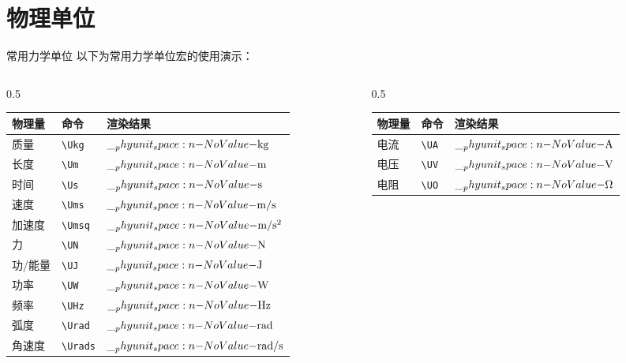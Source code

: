 \documentclass[darkmode=false, randomquote=true, quoteseed=2026, shownav=false,handout=false]{HiBeamer}
\begin{document}
\section{物理单位}

\begin{frame}{常用力学单位}
 以下为常用力学单位宏的使用演示：\\
 \vspace*{-0.5cm}
\begin{columns}
	\begin{column}{0.5\linewidth}
	\begin{center}
		\begin{tabular}{lll}
			\toprule
			物理量   & 命令              & 渲染结果 \\
			\midrule
			质量     & \texttt{\textbackslash Ukg}   & $\Ukg$ \\
			长度     & \texttt{\textbackslash Um}    & $\Um$ \\
			时间     & \texttt{\textbackslash Us}    & $\Us$ \\
			速度     & \texttt{\textbackslash Ums}   & $\Ums$ \\
			加速度   & \texttt{\textbackslash Umsq}  & $\Umsq$ \\
			力       & \texttt{\textbackslash UN}    & $\UN$ \\
			功/能量  & \texttt{\textbackslash UJ}    & $\UJ$ \\
			功率     & \texttt{\textbackslash UW}    & $\UW$ \\
			频率     & \texttt{\textbackslash UHz}   & $\UHz$ \\
			弧度     & \texttt{\textbackslash Urad}  & $\Urad$ \\
			角速度   & \texttt{\textbackslash Urads} & $\Urads$ \\
			\bottomrule
		\end{tabular}
	\end{center}
	\end{column}
	\begin{column}{0.5\linewidth}
		\begin{center}
			\begin{tabular}{lll}
				\toprule
				物理量         & 命令              & 渲染结果 \\
				\midrule
				电流           & \texttt{\textbackslash UA}     & $\UA$ \\
				电压           & \texttt{\textbackslash UV}     & $\UV$ \\
				电阻           & \texttt{\textbackslash UO}     & $\UO$ \\

\end{tabular}
\end{center}
\end{column}
\end{columns}
\end{frame}
\end{document}
